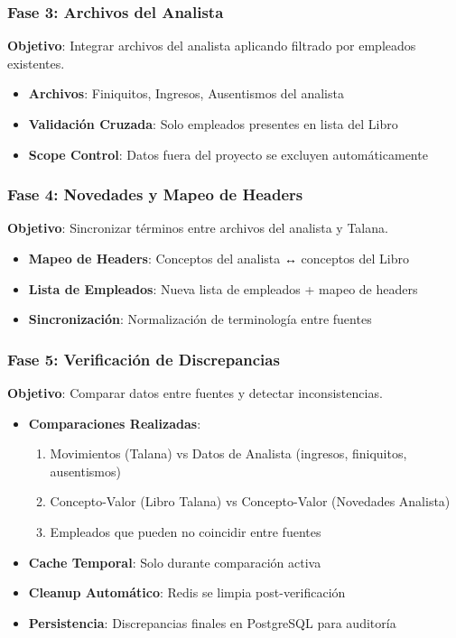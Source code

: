 \subsubsection{Fase 3: Archivos del Analista}

\textbf{Objetivo}: Integrar archivos del analista aplicando filtrado por empleados existentes.

\begin{itemize}
    \item \textbf{Archivos}: Finiquitos, Ingresos, Ausentismos del analista
    \item \textbf{Validación Cruzada}: Solo empleados presentes en lista del Libro
    \item \textbf{Scope Control}: Datos fuera del proyecto se excluyen automáticamente
\end{itemize}

\subsubsection{Fase 4: Novedades y Mapeo de Headers}

\textbf{Objetivo}: Sincronizar términos entre archivos del analista y Talana.

\begin{itemize}
    \item \textbf{Mapeo de Headers}: Conceptos del analista ↔ conceptos del Libro
    \item \textbf{Lista de Empleados}: Nueva lista de empleados + mapeo de headers
    \item \textbf{Sincronización}: Normalización de terminología entre fuentes
\end{itemize}

\subsubsection{Fase 5: Verificación de Discrepancias}

\textbf{Objetivo}: Comparar datos entre fuentes y detectar inconsistencias.

\begin{itemize}
    \item \textbf{Comparaciones Realizadas}:
    \begin{enumerate}
        \item Movimientos (Talana) vs Datos de Analista (ingresos, finiquitos, ausentismos)
        \item Concepto-Valor (Libro Talana) vs Concepto-Valor (Novedades Analista)
        \item Empleados que pueden no coincidir entre fuentes
    \end{enumerate}
    \item \textbf{Cache Temporal}: Solo durante comparación activa
    \item \textbf{Cleanup Automático}: Redis se limpia post-verificación
    \item \textbf{Persistencia}: Discrepancias finales en PostgreSQL para auditoría
\end{itemize}

